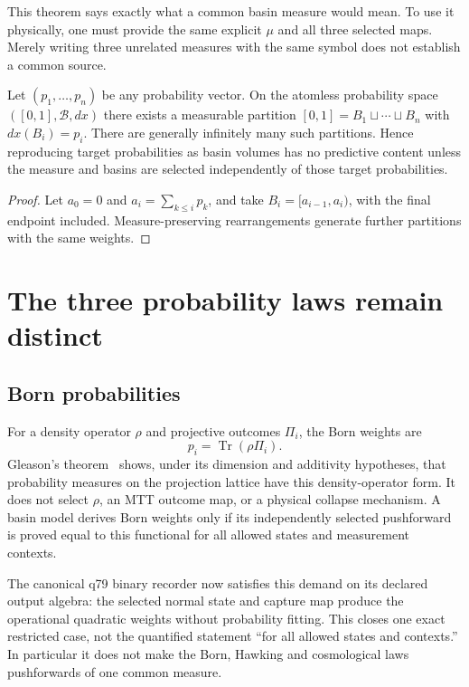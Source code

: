 \documentclass[11pt]{article}
\DeclareMathOperator{\Tr}{Tr}
\begin{document}
This theorem says exactly what a common basin measure would mean. To use it
physically, one must provide the same explicit $\mu$ and all three selected maps.
Merely writing three unrelated measures with the same symbol does not establish a
common source.

\begin{theorem}\label{thm:nonunique}
Let $(p_1,\ldots,p_n)$ be any probability vector. On the atomless probability space
$([0,1],\mathcal B,dx)$ there exists a measurable partition
$[0,1]=B_1\sqcup\cdots\sqcup B_n$ with $dx(B_i)=p_i$. There are generally
infinitely many such partitions. Hence reproducing target probabilities as basin
volumes has no predictive content unless the measure and basins are selected
independently of those target probabilities.
\end{theorem}

\begin{proof}
Let $a_0=0$ and $a_i=\sum_{k\leq i}p_k$, and take
$B_i=[a_{i-1},a_i)$, with the final endpoint included. Measure-preserving
rearrangements generate further partitions with the same weights.
\end{proof}

\section{The three probability laws remain distinct}

\subsection{Born probabilities}

For a density operator $\rho$ and projective outcomes $\Pi_i$, the Born weights are
\[
 p_i=\Tr(\rho\Pi_i).
\]
Gleason's theorem~\cite{Gleason1957} shows, under its dimension and additivity
hypotheses, that
probability measures on the projection lattice have this density-operator form. It
does not select $\rho$, an MTT outcome map, or a physical collapse mechanism. A basin
model derives Born weights only if its independently selected pushforward is proved
equal to this functional for all allowed states and measurement contexts.

The canonical q79 binary recorder now satisfies this demand on its declared output
algebra: the selected normal state and capture map produce the operational quadratic
weights without probability fitting. This closes one exact restricted case, not the
quantified statement ``for all allowed states and contexts.'' In particular it does
not make the Born, Hawking and cosmological laws pushforwards of one common measure.
\end{document}
